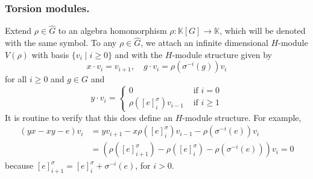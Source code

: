 \documentclass[11pt, twoside]{amsart}
\theoremstyle{definition}
\newcommand{\KK}{\mathbb{K}}
\newcommand{\wind}[2]{[#1]_{#2}^{\sigma}}
\begin{document}
\subsubsection*{Torsion modules.} 
Extend $\rho \in \widehat{G}$ to an algebra homomorphism $\rho: \KK[G] \to \KK$, which will be denoted with the same symbol. To any $\rho \in \widehat{G}$, we  attach an infinite dimensional $H$-module $V(\rho)$ with basis $\{v_i \mid i \geq 0\}$ and with the $H$-module structure given by
%
\[x\cdot v_i = v_{i+1},\quad g\cdot v_i = \rho(\sigma^{-i}(g))v_i\]
%
for all $i \geq 0$ and $g \in G$ and
%
\[y\cdot v_i = \begin{cases}
    0 & \text{ if } i = 0\\ \rho(\wind{e}{i})v_{i-1} & \text{ if } i \geq 1
\end{cases}\]
%
It is routine to verify that this does define an $H$-module structure. For example, 
%
\begin{align*}
    (yx - xy - e)v_i & = yv_{i+1} - x\rho(\wind{e}{i})v_{i-1} - \rho(\sigma^{-i}(e))v_{i}\\
    & = \left(\rho(\wind{e}{i+1}) - \rho(\wind{e}{i})- \rho(\sigma^{-i}(e))\right)v_i = 0
\end{align*}
%
because $\wind{e}{i+1} = \wind{e}{i} + \sigma^{-i}(e)$, for $i>0$.
\end{document}

